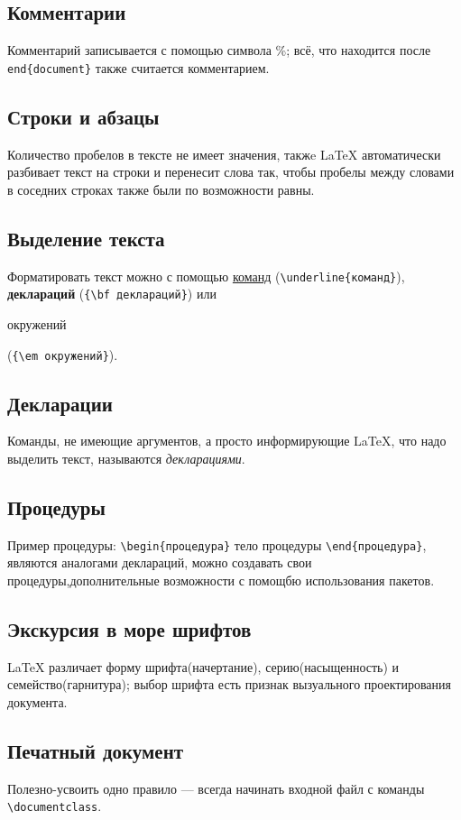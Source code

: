 \documentclass[a4paper,12pt]{article}
\begin{document}
\subsection{Комментарии}
Комментарий записывается с помощью символа \%; всё, что находится после \verb=end{document}= также считается комментарием.
\subsection{Строки и абзацы}
Количество пробелов в тексте не имеет значения, такжe \LaTeX{} автоматически разбивает текст на строки и перенесит слова так, чтобы пробелы между словами в соседних строках также были по возможности равны.
\subsection{Выделение текста}
Форматировать текст можно с помощью \underline{команд} (\verb=\underline{команд}=), {\bf деклараций} (\verb={\bf деклараций}=) или \begin{em}окружений\end{em} (\verb={\em окружений}=).

\subsection{Декларации}
Команды, не имеющие аргументов, а просто информирующие \LaTeX, что надо выделить текст, называются {\em декларациями}.
\subsection{Процедуры}
Пример процедуры: \verb=\begin{процедура}= тело процедуры \verb=\end{процедура}=, являются аналогами деклараций, можно создавать свои процедуры,дополнительные возможности с помощбю использования пакетов.
\subsection{Экскурсия в море шрифтов}
\LaTeX{} различает форму шрифта(начертание), серию(насыщенность) и семейство(гарнитура); выбор шрифта есть признак вызуального проектирования документа.
\subsection{Печатный документ}
Полезно-усвоить одно правило --- всегда начинать входной файл с команды  \verb=\documentclass=.
\end{document}
